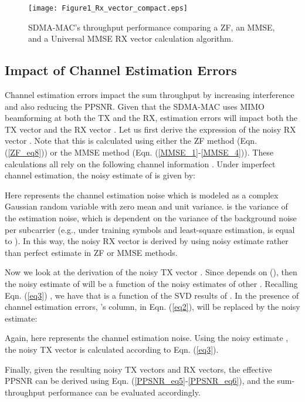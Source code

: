 \documentclass[journal, final]{IEEEtran}
\begin{document}
\begin{figure}
\centering
\texttt{[image: Figure1\_Rx\_vector\_compact.eps]}
\caption{SDMA-MAC's throughput performance comparing a ZF, an MMSE, and a Universal MMSE RX vector calculation algorithm.}
\label{Fig1_Rx_vector}
\end{figure}

\subsection{Impact of Channel Estimation Errors}

Channel estimation errors impact the sum throughput by increasing interference and also reducing the PPSNR. Given that the SDMA-MAC uses MIMO beamforming at both the TX and the RX, estimation errors will impact both the TX vector 
and the RX vector . Let us first derive the expression of the noisy RX vector . Note that this is calculated using either the ZF method
(Eqn. (\ref{ZF_eq8})) or the MMSE method (Eqn. (\ref{MMSE_1}-\ref{MMSE_4})). These calculations all rely
on the following channel information . Under imperfect channel estimation, the noisy estimate of  is given by:

Here  represents the channel estimation noise
which is modeled as a complex Gaussian random variable with zero mean and
unit variance.  is the variance of the estimation noise, which
is dependent on the variance of the background noise per subcarrier  (e.g., under  training symbols and least-square estimation,
 is equal to  \cite{3_NULLHOC}). In this way, the noisy RX
vector  is derived by using noisy estimate
 rather than perfect
estimate  in ZF or MMSE methods.





Now we look at the derivation of the noisy TX vector . Since  depends on 
(), then the noisy estimate of 
will be a function of the noisy estimates of other . Recalling Eqn. (\ref{eq3}) , we have that  is a function of the
SVD results of . In the presence of channel estimation
errors, 's column,  in Eqn. (\ref{eq2}), will be replaced by
the noisy estimate:

Again, here  represents the channel
estimation noise. Using the noisy estimate , the noisy TX vector  is calculated according to Eqn. (\ref{eq3}).

Finally, given the resulting noisy TX vectors and RX vectors, the effective
PPSNR can be derived using Eqn. (\ref{PPSNR_eq5}-\ref{PPSNR_eq6}), and the sum-throughput performance
can be evaluated accordingly.
\end{document}
